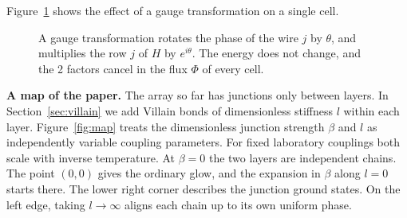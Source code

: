 \documentclass[11pt,a4paper]{article}
\theoremstyle{remark}
\begin{document}
Figure~\ref{fig:cell} shows the effect of a gauge transformation on a single cell.

\begin{figure}[H]
\centering
{}
\caption{A gauge transformation rotates the phase of the wire $j$ by $\theta$, and multiplies the row $j$ of $H$ by $e^{i\theta}$. The energy does not change, and the 2 factors cancel in the flux $\Phi$ of every cell.}\label{fig:cell}
\end{figure}

\medskip
\noindent\textbf{A map of the paper.}
The array so far has junctions only between layers. In Section~\ref{sec:villain} we add Villain bonds of dimensionless stiffness $l$ within each layer. Figure~\ref{fig:map} treats the dimensionless junction strength $\beta$ and $l$ as independently variable coupling parameters. For fixed laboratory couplings both scale with inverse temperature. At $\beta=0$ the two layers are independent chains. The point $(0,0)$ gives the ordinary glow, and the expansion in $\beta$ along $l=0$ starts there. The lower right corner describes the junction ground states. On the left edge, taking $l\to\infty$ aligns each chain up to its own uniform phase.
\end{document}
